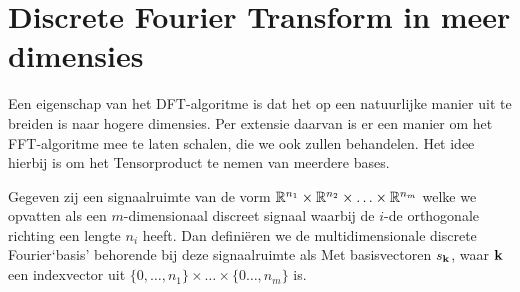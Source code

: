 \section{Discrete Fourier Transform in meer dimensies}
Een eigenschap van het DFT-algoritme is dat het op een natuurlijke manier uit te breiden is naar hogere dimensies.
Per extensie daarvan is er een manier om het FFT-algoritme mee te laten schalen, die we ook zullen behandelen.
Het idee hierbij is om het Tensorproduct te nemen van meerdere bases.

\begin{definitie}
  Gegeven zij een signaalruimte van de vorm
  $\mathbb{R}^{n_1} \times \mathbb{R}^{n_2} \times \ldots \times \mathbb{R}^{n_m}$ welke we opvatten als
  een $m$-dimensionaal discreet signaal waarbij de $i$-de orthogonale richting een lengte $n_i$ heeft.
  Dan defini\"eren we de multidimensionale discrete Fourier`basis' behorende bij deze signaalruimte als
  Met basisvectoren $s_{\bold k}$, waar $\bold k$ een indexvector uit $\{0, \ldots, n_1\}\times\ldots\times\{0\ldots, n_m\}$ is.
\end{definitie}

